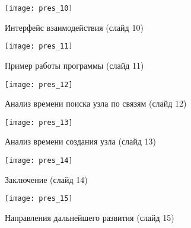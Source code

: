 \begin{figure}[ht!]\centering
	\texttt{[image: pres\_10]}
	\caption{Интерфейс взаимодействия (слайд 10)}
\end{figure}

\begin{figure}[ht!]\centering
	\texttt{[image: pres\_11]}
	\caption{Пример работы программы (слайд 11)}
\end{figure}

\begin{figure}[ht!]\centering
	\texttt{[image: pres\_12]}
	\caption{Анализ времени поиска узла по связям (слайд 12)}
\end{figure}

\begin{figure}[ht!]\centering
	\texttt{[image: pres\_13]}
	\caption{Анализ времени создания узла (слайд 13)}
\end{figure}

\begin{figure}[ht!]\centering
	\texttt{[image: pres\_14]}
	\caption{Заключение (слайд 14)}
\end{figure}

\begin{figure}[ht!]\centering
	\texttt{[image: pres\_15]}
	\caption{Направления дальнейшего развития (слайд 15)}
\end{figure}
